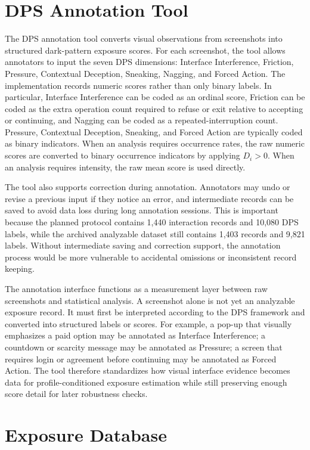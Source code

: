\section{DPS Annotation Tool}

The DPS annotation tool converts visual observations from screenshots into structured dark-pattern exposure scores. For each screenshot, the tool allows annotators to input the seven DPS dimensions: Interface Interference, Friction, Pressure, Contextual Deception, Sneaking, Nagging, and Forced Action. The implementation records numeric scores rather than only binary labels. In particular, Interface Interference can be coded as an ordinal score, Friction can be coded as the extra operation count required to refuse or exit relative to accepting or continuing, and Nagging can be coded as a repeated-interruption count. Pressure, Contextual Deception, Sneaking, and Forced Action are typically coded as binary indicators. When an analysis requires occurrence rates, the raw numeric scores are converted to binary occurrence indicators by applying \(D_i>0\). When an analysis requires intensity, the raw mean score is used directly.

The tool also supports correction during annotation. Annotators may undo or revise a previous input if they notice an error, and intermediate records can be saved to avoid data loss during long annotation sessions. This is important because the planned protocol contains 1,440 interaction records and 10,080 DPS labels, while the archived analyzable dataset still contains 1,403 records and 9,821 labels. Without intermediate saving and correction support, the annotation process would be more vulnerable to accidental omissions or inconsistent record keeping.

The annotation interface functions as a measurement layer between raw screenshots and statistical analysis. A screenshot alone is not yet an analyzable exposure record. It must first be interpreted according to the DPS framework and converted into structured labels or scores. For example, a pop-up that visually emphasizes a paid option may be annotated as Interface Interference; a countdown or scarcity message may be annotated as Pressure; a screen that requires login or agreement before continuing may be annotated as Forced Action. The tool therefore standardizes how visual interface evidence becomes data for profile-conditioned exposure estimation while still preserving enough score detail for later robustness checks.

\section{Exposure Database}

